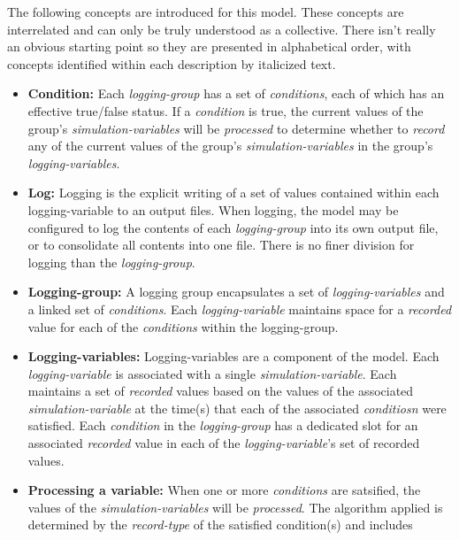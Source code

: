 \documentclass[11pt,fleqn]{report}
\begin{document}
The following concepts are introduced for this model. These concepts are
interrelated and can only be truly understood as a collective. There isn't
really an obvious starting point so they are presented in alphabetical
order, with concepts identified within each description by italicized text.
\begin{itemize}
  \item \textbf{Condition:} Each \textit{logging-group} has a set of
        \textit{conditions}, each of which has an effective true/false status.
        If a \textit{condition} is true, the
        current values of the group's \textit{simulation-variables} will be
        \textit{processed} to determine whether to  \textit{record} any of the
        current values of the group's \textit{simulation-variables} in the
        group's \textit{logging-variables}.
  \item \textbf{Log:} Logging is the explicit writing of a set of values
        contained within each logging-variable to an output files.
        When logging, the model may be configured to log the contents of each
        \textit{logging-group} into its own output file, or to consolidate
        all contents into one file.
        There is no finer division for logging than the \textit{logging-group}.
  \item \textbf{Logging-group:} A logging group encapsulates a set of
        \textit{logging-variables} and a linked set of \textit{conditions}. Each
        \textit{logging-variable} maintains space for a \textit{recorded}
        value for each of the  \textit{conditions} within the logging-group.
  \item \textbf{Logging-variables:} Logging-variables are a component of the
        model. Each \textit{logging-variable} is associated with a single
        \textit{simulation-variable}. Each maintains a set of
        \textit{recorded} values based on the values of the associated
        \textit{simulation-variable} at the time(s) that each of the associated
        \textit{conditiosn} were satisfied.
        Each \textit{condition} in the \textit{logging-group} has a dedicated
        slot for an associated \textit{recorded} value in each of the
        \textit{logging-variable}'s set of recorded values.
  \item \textbf{Processing a variable:} When one or more \textit{conditions}
        are satsified, the values of the \textit{simulation-variables} will be
        \textit{processed}. The algorithm applied is determined by the
        \textit{record-type} of the satisfied condition(s) and includes

\end{itemize}
\end{document}
